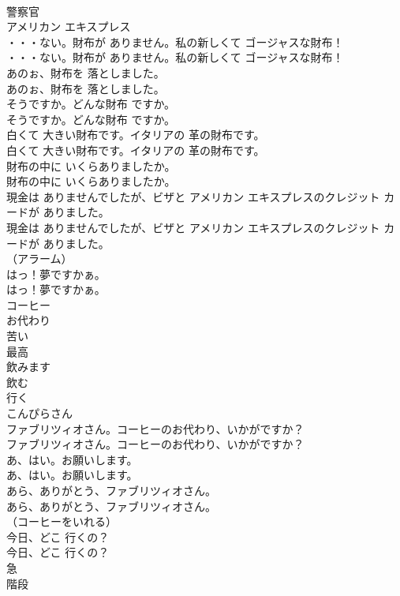 \documentclass[8pt]{extreport}
\begin{document}
\begin{CJK}{UTF8}{min}
\\	警察官
\\	アメリカン エキスプレス
\\	・・・ない。財布が ありません。私の新しくて ゴージャスな財布！	
\\	・・・ない。財布が ありません。私の新しくて ゴージャスな財布！ 
\\	あのぉ、財布を 落としました。	
\\	あのぉ、財布を 落としました。 
\\	そうですか。どんな財布 ですか。	
\\	そうですか。どんな財布 ですか。 
\\	白くて 大きい財布です。イタリアの 革の財布です。	
\\	白くて 大きい財布です。イタリアの 革の財布です。 
\\	財布の中に いくらありましたか。	
\\	財布の中に いくらありましたか。 
\\	現金は ありませんでしたが、ビザと アメリカン エキスプレスのクレジット カードが ありました。	
\\	現金は ありませんでしたが、ビザと アメリカン エキスプレスのクレジット カードが ありました。 
\\	（アラーム）	
\\	はっ！夢ですかぁ。	
\\	はっ！夢ですかぁ。 
\\	コーヒー
\\	お代わり
\\	苦い
\\	最高
\\	飲みます
\\	飲む
\\	行く
\\	こんぴらさん
\\	ファブリツィオさん。コーヒーのお代わり、いかがですか？	
\\	ファブリツィオさん。コーヒーのお代わり、いかがですか？ 
\\	あ、はい。お願いします。	
\\	あ、はい。お願いします。 
\\	あら、ありがとう、ファブリツィオさん。	
\\	あら、ありがとう、ファブリツィオさん。 
\\	（コーヒーをいれる）	
\\	今日、どこ 行くの？	
\\	今日、どこ 行くの？ 
\\	急
\\	階段

\end{CJK}
\end{document}
